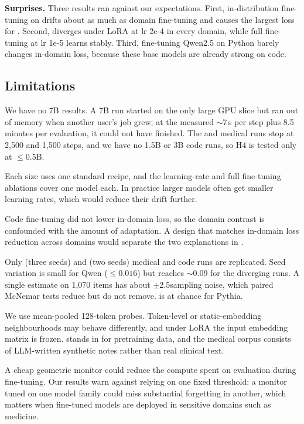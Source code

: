 {\bf Surprises.} Three results ran against our expectations. First, in-distribution fine-tuning on \wikitext drifts about as much as domain fine-tuning and causes the largest \mmlu loss for \qwenS. Second, \pythiaS diverges under LoRA at lr 2e-4 in every domain, while full fine-tuning at lr 1e-5 learns stably. Third, fine-tuning Qwen2.5 on Python barely changes in-domain loss, because these base models are already strong on code.

\subsection{Limitations}
\label{sec:limitations}

 We have no 7B results. A 7B run started on the only large GPU slice but ran out of memory when another user's job grew; at the measured $\sim$7\,s per step plus 8.5 minutes per evaluation, it could not have finished. The \qwenM and \qwenL medical runs stop at 2,500 and 1,500 steps, and we have no 1.5B or 3B code runs, so H4 is tested only at $\leq$0.5B.

 Each size uses one standard recipe, and the learning-rate and full fine-tuning ablations cover one model each. In practice larger models often get smaller learning rates, which would reduce their drift further.

 Code fine-tuning did not lower in-domain loss, so the domain contrast is confounded with the amount of adaptation. A design that matches in-domain loss reduction across domains would separate the two explanations in .

 Only \qwenS (three seeds) and \pythiaS (two seeds) medical and code runs are replicated. Seed variation is small for Qwen ($\leq 0.016$) but reaches $\sim$0.09 for the diverging \pythiaS runs. A single \gk estimate on 1,070 items has about $\pm$2.5\pp sampling noise, which paired McNemar tests reduce but do not remove. \mmlu is at chance for Pythia.

 We use mean-pooled 128-token \wikitext probes. Token-level or static-embedding neighbourhoods may behave differently, and under LoRA the input embedding matrix is frozen. \wikitext stands in for pretraining data, and the medical corpus consists of LLM-written synthetic notes rather than real clinical text.

 A cheap geometric monitor could reduce the compute spent on evaluation during fine-tuning. Our results warn against relying on one fixed threshold: a monitor tuned on one model family could miss substantial forgetting in another, which matters when fine-tuned models are deployed in sensitive domains such as medicine.

